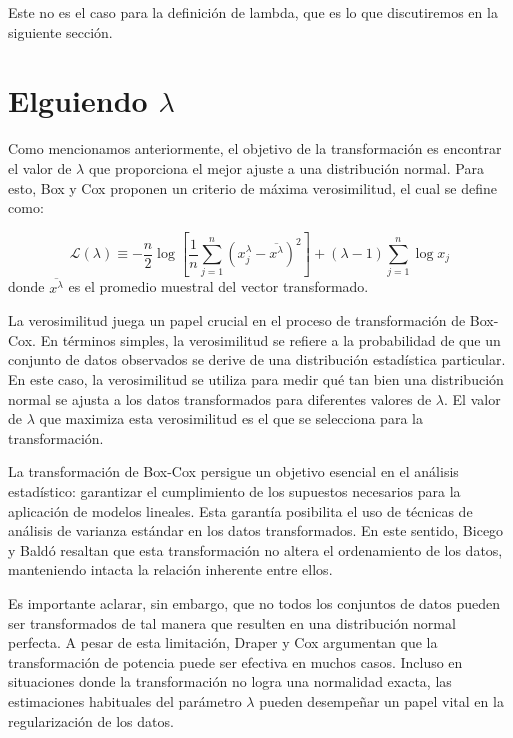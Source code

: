     Este no es el caso para la definici\'on de lambda, que es lo que discutiremos en la siguiente secci\'on.

    \section[Eliguiendo Lambda]{Elguiendo $\lambda$}

    Como mencionamos anteriormente, el objetivo de la transformaci\'on es encontrar el valor de $\lambda$ que proporciona el mejor ajuste a una distribuci\'on normal. Para esto, Box y Cox proponen un criterio de m\'axima verosimilitud, el cual se define como:

    \begin{equation}
        \mathcal{L}(\lambda) \equiv-\frac{n}{2} \log \left[\frac{1}{n} \sum_{j=1}^{n}\left(x_{j}^{\lambda}-\overline{x^{\lambda}}\right)^{2}\right] +(\lambda-1) \sum_{j=1}^{n} \log x_{j}
    \end{equation}
    donde $\overline{x^{\lambda}}$ es el promedio muestral del vector transformado.

    La verosimilitud juega un papel crucial en el proceso de transformaci\'on de Box-Cox. En t\'erminos simples, la verosimilitud se refiere a la probabilidad de que un conjunto de datos observados se derive de una distribuci\'on estad\'istica particular. En este caso, la verosimilitud se utiliza para medir qu\'e tan bien una distribuci\'on normal se ajusta a los datos transformados para diferentes valores de $\lambda$. El valor de $\lambda$ que maximiza esta verosimilitud es el que se selecciona para la transformaci\'on.

    
    La transformaci\'on de Box-Cox persigue un objetivo esencial en el an\'alisis estad\'istico: garantizar el cumplimiento de los supuestos necesarios para la aplicaci\'on de modelos lineales. Esta garant\'ia posibilita el uso de t\'ecnicas de an\'alisis de varianza est\'andar en los datos transformados. En este sentido, Bicego y Bald\'o \cite{bicego2016} resaltan que esta transformaci\'on no altera el ordenamiento de los datos, manteniendo intacta la relaci\'on inherente entre ellos.

    Es importante aclarar, sin embargo, que no todos los conjuntos de datos pueden ser transformados de tal manera que resulten en una distribuci\'on normal perfecta. A pesar de esta limitaci\'on, Draper y Cox \cite{draper1969}argumentan que la transformaci\'on de potencia puede ser efectiva en muchos casos. Incluso en situaciones donde la transformaci\'on no logra una normalidad exacta, las estimaciones habituales del par\'ametro $\lambda$ pueden desempe\~nar un papel vital en la regularizaci\'on de los datos.


